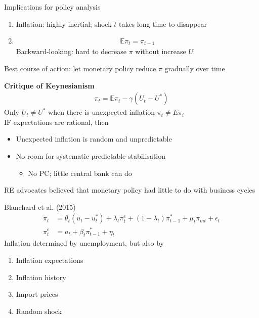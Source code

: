 \documentclass{beamer}
\begin{document}
\begin{frame}
Implications for policy analysis
\begin{enumerate}
  \item Inflation: highly inertial; shock $t$ takes long time to disappear
  \item \begin{align} \mathbb{E}\pi_t=\pi_{t-1}  \end{align}
  Backward-looking: hard to decrease $\pi$ without increase $U$
\end{enumerate}
\medskip
Best course of action: let monetary policy reduce $\pi$ gradually over time
\end{frame}


\begin{frame}
  \textbf{Critique of Keynesianism}
  \begin{align}
  \pi_t = \mathbb{E}\pi_t - \gamma (U_t - U^*) 
\end{align}
Only $U_t \neq U^*$ when there is unexpected inflation $\pi_t \neq E\pi_t$\\
\medskip
  IF expectations are rational, then
  \begin{itemize}
    \item Unexpected inflation is random and unpredictable
    \item No room for systematic predictable stabilisation 
    \begin{itemize}
      \item No PC; little central bank can do
    \end{itemize}
  \end{itemize}
RE advocates believed that monetary policy had little to do with business cycles
\end{frame}

\begin{frame}
  Blanchard et al. (2015)
  \begin{align}
    \pi_t &= \theta_t(u_t-u^*_t) + \lambda_t\pi_t^e + (1-\lambda_t)\pi_{t-1}^* + \mu_t\pi_{mt} + \epsilon_t\\
    \pi_t^e &= a_t + \beta_t\pi_{t-1}^* + \eta_t
  \end{align}
  \medskip
  Inflation determined by unemployment, but also by
  \begin{enumerate}
    \item Inflation expectations
    \item Inflation history
    \item Import prices
    \item Random shock
  \end{enumerate}
\end{frame}
\end{document}

